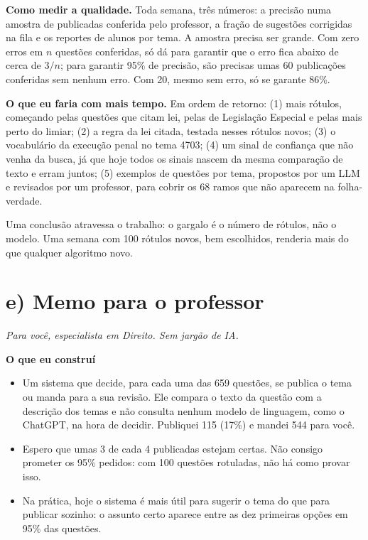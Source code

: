\documentclass[11pt,a4paper]{article}
\newcommand{\bd}[1]{\textbf{#1}}
\begin{document}
\bd{Como medir a qualidade.} Toda semana, três números: a precisão numa amostra de publicadas
conferida pelo professor, a fração de sugestões corrigidas na fila e os reportes de alunos por
tema. A amostra precisa ser grande. Com zero erros em $n$ questões conferidas, só dá para garantir
que o erro fica abaixo de cerca de $3/n$; para garantir 95\% de precisão, são precisas umas 60
publicações conferidas sem nenhum erro. Com 20, mesmo sem erro, só se garante 86\%.

\bd{O que eu faria com mais tempo.} Em ordem de retorno: (1) mais rótulos, começando pelas questões
que citam lei, pelas de Legislação Especial e pelas mais perto do limiar; (2) a regra da lei citada,
testada nesses rótulos novos; (3) o vocabulário da execução penal no tema 4703; (4) um sinal de
confiança que não venha da busca, já que hoje todos os sinais nascem da mesma comparação de texto
e erram juntos; (5) exemplos de questões por tema, propostos por um LLM e revisados por um
professor, para cobrir os 68 ramos que não aparecem na folha-verdade.

Uma conclusão atravessa o trabalho: o gargalo é o número de rótulos, não o modelo. Uma semana com
100 rótulos novos, bem escolhidos, renderia mais do que qualquer algoritmo novo.

\clearpage
\section{e) Memo para o professor}
{\small\itshape Para você, especialista em Direito. Sem jargão de IA.}

\bd{O que eu construí}
\begin{itemize}
\item Um sistema que decide, para cada uma das 659 questões, se publica o tema ou manda para a sua
      revisão. Ele compara o texto da questão com a descrição dos temas e não consulta nenhum
      modelo de linguagem, como o ChatGPT, na hora de decidir. Publiquei 115 (17\%) e mandei 544
      para você.
\item Espero que umas 3 de cada 4 publicadas estejam certas. Não consigo prometer os 95\% pedidos:
      com 100 questões rotuladas, não há como provar isso.
\item Na prática, hoje o sistema é mais útil para sugerir o tema do que para publicar sozinho: o
      assunto certo aparece entre as dez primeiras opções em 95\% das questões.
\end{itemize}
\end{document}
